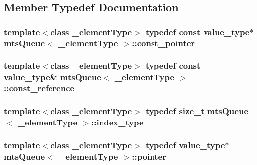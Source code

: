 \subsection{Member Typedef Documentation}
\hypertarget{classmts_queue_a1224d9a0146fab27bdb1db050288acb4}{
\subsubsection[{const\-\_\-pointer}]{\setlength{\rightskip}{0pt plus 5cm}template$<$class \-\_\-element\-Type$>$ typedef const {\bf value\-\_\-type}$\ast$ {\bf mts\-Queue}$<$ \-\_\-element\-Type $>$\-::{\bf const\-\_\-pointer}}}\label{classmts_queue_a1224d9a0146fab27bdb1db050288acb4}
\hypertarget{classmts_queue_a3ae67f8b6cdb9686e5fca9ed1740290e}{
\subsubsection[{const\-\_\-reference}]{\setlength{\rightskip}{0pt plus 5cm}template$<$class \-\_\-element\-Type$>$ typedef const {\bf value\-\_\-type}\& {\bf mts\-Queue}$<$ \-\_\-element\-Type $>$\-::{\bf const\-\_\-reference}}}\label{classmts_queue_a3ae67f8b6cdb9686e5fca9ed1740290e}
\hypertarget{classmts_queue_a2ddbc96d89691532f84001deeaa19ffe}{
\subsubsection[{index\-\_\-type}]{\setlength{\rightskip}{0pt plus 5cm}template$<$class \-\_\-element\-Type$>$ typedef size\-\_\-t {\bf mts\-Queue}$<$ \-\_\-element\-Type $>$\-::{\bf index\-\_\-type}}}\label{classmts_queue_a2ddbc96d89691532f84001deeaa19ffe}
\hypertarget{classmts_queue_a66d423ede5c12e015a4e070e1bc23f43}{
\subsubsection[{pointer}]{\setlength{\rightskip}{0pt plus 5cm}template$<$class \-\_\-element\-Type$>$ typedef {\bf value\-\_\-type}$\ast$ {\bf mts\-Queue}$<$ \-\_\-element\-Type $>$\-::{\bf pointer}}}\label{classmts_queue_a66d423ede5c12e015a4e070e1bc23f43}
